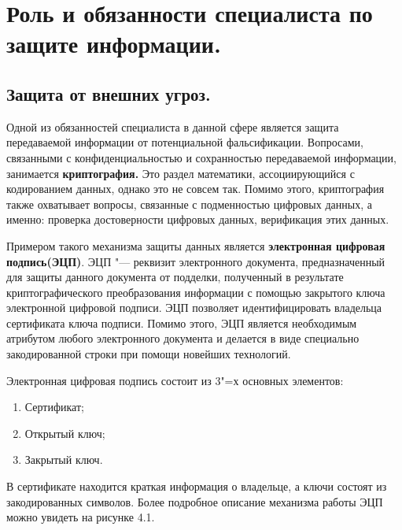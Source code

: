 \section{Роль и обязанности специалиста по защите информации.}
\subsection{Защита от внешних угроз.}
    Одной из обязанностей специалиста в данной сфере является защита передаваемой информации от потенциальной фальсификации. Вопросами, связанными с конфиденциальностью и 
    сохранностью передаваемой информации, занимается
    \textbf{криптография.} Это раздел математики, ассоциирующийся с кодированием данных, однако это не совсем так.
    Помимо этого, криптография также охватывает вопросы, связанные с подменностью цифровых данных, а именно: проверка достоверности
    цифровых данных, верификация этих данных.

    Примером такого механизма защиты данных является \textbf{электронная цифровая подпись(ЭЦП)}. ЭЦП "--- реквизит электронного документа, предназначенный для 
    защиты данного документа от подделки, полученный в результате криптографического преобразования
    информации с помощью закрытого ключа электронной цифровой подписи. ЭЦП позволяет идентифицировать владельца сертификата
    ключа подписи. Помимо этого, ЭЦП является необходимым атрибутом любого электронного документа и делается в виде специально
    закодированной строки при помощи новейших технологий.  

    Электронная цифровая подпись состоит из 3"=х основных элементов:

    \begin{enumerate}
        \item Сертификат;
        \item Открытый ключ;
        \item Закрытый ключ.
    \end{enumerate}

    В сертификате находится краткая информация о владельце, а ключи состоят из закодированных символов. Более подробное описание механизма работы ЭЦП можно увидеть на рисунке 4.1. 

